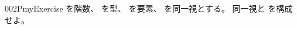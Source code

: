 \documentclass[index]{subfiles}
\begin{document}
\begin{myBlock}{002P}{myExercise}
  を階数、
  を型、
  を要素、
  を同一視とする。
  同一視と
  を構成せよ。
\end{myBlock}
\end{document}
